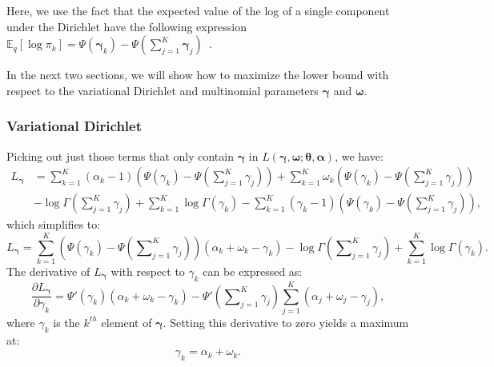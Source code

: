 \documentclass{article}
\begin{document}
Here, we use the fact that the expected value of the log of a single component under the Dirichlet have the following expression $\mathbb{E}_q\left[\log \pi_k\right] = \Psi\left(\bm{\gamma}_k\right)-\Psi\left(\sum_{j=1}^K \bm{\gamma}_j\right)$~\cite{blei2003latent}.


In the next two sections, we will show how to maximize the lower bound with respect to the variational Dirichlet and multinomial parameters $\bm{\gamma}$ and $\bm{\omega}$.


\subsubsection{Variational Dirichlet}
\label{App:VaDirichlet}


Picking out just those terms that only contain $\bm{\gamma}$ in $L\left(\bm{\gamma},\bm{\omega};\bm{\theta},\bm{\alpha}\right)$, we have:
\begin{align}
\label{eq:Appendix15}
L_{\bm{\gamma}}
&=
\sum_{k=1}^K
\left( \alpha_k-1 \right)
\left( \Psi\left(\gamma_k\right)-\Psi\left(\sum\nolimits_{j=1}^K\gamma_j\right) \right)
+\sum_{k=1}^K
\omega_k
\left(\Psi \left( \gamma_k \right)-\Psi \left( \sum\nolimits_{j=1}^K \gamma_j \right) \right) \nonumber \\
&-\log \Gamma \left( \sum\nolimits_{j=1}^K\gamma_j\right)
+\sum_{k=1}^K\log \Gamma \left( \gamma_k \right)
-\sum\nolimits_{k=1}^K
\left( \gamma_k-1 \right)
\left( \Psi\left( \gamma_k \right) -\Psi \left( \sum\nolimits_{j=1}^K \gamma_j\right) \right),
\end{align}
\noindent which simplifies to:
\begin{equation}
\label{eq:Appendix16}
L_{\bm{\gamma}}
=
\sum_{k=1}^K
\left( \Psi\left( \gamma_k \right) -\Psi \left( \sum\nolimits_{j=1}^K \gamma_j\right) \right)
\left( \alpha_k + \omega_k - \gamma_k \right)
-\log \Gamma \left( \sum\nolimits_{j=1}^K\gamma_j\right)
+\sum_{k=1}^K\log \Gamma \left( \gamma_k \right).
\end{equation}
\noindent The derivative of $L_{\bm{\gamma}}$ with respect to $\gamma_k$ can be expressed as:
\begin{equation}
\label{eq:Appendix17}
\frac{\partial L_{\bm{\gamma}}}
{\partial{\gamma_k}}
=
\Psi'\left( \gamma_k \right)
\left( \alpha_k + \omega_k - \gamma_k \right)
- \Psi'\left( \sum\nolimits_{j=1}^K \gamma_j \right)
\sum_{j=1}^K \left(\alpha_j + \omega_j - \gamma_j \right),
\end{equation}
where $\gamma_k$ is the $k^{th}$ element of $\bm{\gamma}$. Setting this derivative to zero yields a maximum at:
\begin{equation}
\label{eq:Appendix18}
\gamma_k
=
\alpha_k
+
\omega_k.
\end{equation}
\end{document}
